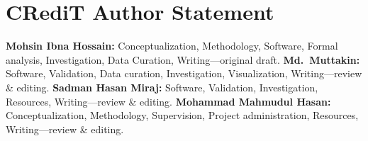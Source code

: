 \documentclass[journal]{IEEEtran}
\begin{document}
\section*{CRediT Author Statement}
\textbf{Mohsin Ibna Hossain:} Conceptualization, Methodology, Software, Formal analysis, Investigation, Data Curation, Writing---original draft.
\textbf{Md.~Muttakin:} Software, Validation, Data curation, Investigation, Visualization, Writing---review \& editing.
\textbf{Sadman Hasan Miraj:} Software, Validation, Investigation, Resources, Writing---review \& editing.
\textbf{Mohammad Mahmudul Hasan:} Conceptualization, Methodology, Supervision, Project administration, Resources, Writing---review \& editing.



\end{document}
